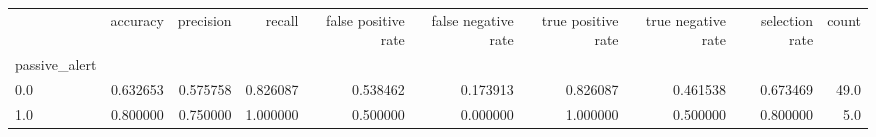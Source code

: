 \begin{tabular}{lrrrrrrrrr}
\toprule
{} &  accuracy &  precision &    recall &  false positive rate &  false negative rate &  true positive rate &  true negative rate &  selection rate &  count \\
passive\_alert &           &            &           &                      &                      &                     &                     &                 &        \\
\midrule
0.0           &  0.632653 &   0.575758 &  0.826087 &             0.538462 &             0.173913 &            0.826087 &            0.461538 &        0.673469 &   49.0 \\
1.0           &  0.800000 &   0.750000 &  1.000000 &             0.500000 &             0.000000 &            1.000000 &            0.500000 &        0.800000 &    5.0 \\
\bottomrule
\end{tabular}

